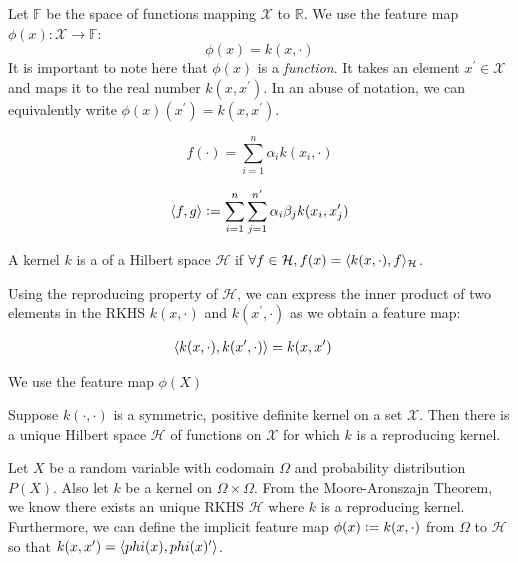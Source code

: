 Let $\mathbb{F}$ be the space of functions mapping $\mathcal{X}$ to $\mathbb{R}$. We use the feature map $\phi(x) : \mathcal{X} \to \mathbb{F}$:
\begin{equation}
	\phi(x) = k(x, \cdot)
\end{equation}
It is important to note here that $\phi(x)$ is a \emph{function}. It takes an element $x^\prime \in \mathcal{X}$ and maps it to the real number $k(x, x^\prime)$. In an abuse of notation, we can equivalently write $\phi(x)(x^\prime) = k(x, x^\prime)$.

\begin{equation}
	f(\cdot) = \sum_{i=1}^n \alpha_i k(x_i, \cdot)
\end{equation}

\begin{equation}
	\langle f, g\rangle \vcentcolon= \sum_{i=1}^n \sum_{j=1}^{n^\prime} \alpha_i \beta_j k(x_i, x_j^\prime)
\end{equation}

\begin{definition}
	A kernel $k$ is a  of a Hilbert space $\mathcal{H}$ if $\forall f \in \mathcal{H}, f(x) = \langle k(x, \cdot), f\rangle_\mathcal{H}$.
\end{definition}

Using the reproducing property of $\mathcal{H}$, we can express the inner product of two elements in the RKHS $k(x, \cdot)$ and $k(x^\prime, \cdot)$ as we obtain a feature map:

\begin{align}
	\langle k(x, \cdot), k(x^\prime, \cdot)\rangle &= k(x, x^\prime)
\end{align}

We use the feature map $\phi(X)$



\begin{theorem}
Suppose $k(\cdot, \cdot)$ is a symmetric, positive definite kernel on a set $\mathcal{X}$. Then there is a unique Hilbert space $\mathcal{H}$ of functions on $\mathcal{X}$ for which $k$ is a reproducing kernel.
\end{theorem}

Let $X$ be a random variable with codomain $\Omega$ and probability distribution $P(X)$. Also let $k$ be a kernel on $\Omega \times \Omega$. From the Moore-Aronszajn Theorem, we know there exists an unique RKHS $\mathcal{H}$ where $k$ is a reproducing kernel. Furthermore, we can define the implicit feature map $\phi(x) \vcentcolon= k(x, \cdot)$ from $\Omega$ to $\mathcal{H}$ so that $k(x, x^\prime) = \langle phi(x), phi(x)^\prime\rangle$.

